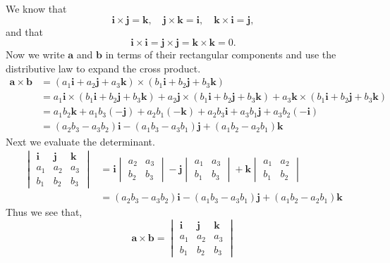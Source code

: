 {%
\begin{Solution}
\label{solution matrix form of cross product}
We know that 
\[
\mathbf{i} \times \mathbf{j} = \mathbf{k}, \quad
\mathbf{j} \times \mathbf{k} = \mathbf{i}, \quad
\mathbf{k} \times \mathbf{i} = \mathbf{j},
\]
and that
\[
\mathbf{i} \times \mathbf{i} = 
\mathbf{j} \times \mathbf{j} = 
\mathbf{k} \times \mathbf{k} = 0.
\]
Now we write $\mathbf{a}$ and $\mathbf{b}$ in terms of their rectangular
components and use the distributive law to expand the cross product.
\begin{align*}
\mathbf{a} \times \mathbf{b}
        &= (a_1 \mathbf{i} + a_2 \mathbf{j} + a_3 \mathbf{k} ) \times
          (b_1 \mathbf{i} + b_2 \mathbf{j} + b_3 \mathbf{k} ) \\
        &= a_1 \mathbf{i} \times
          (b_1 \mathbf{i} + b_2 \mathbf{j} + b_3 \mathbf{k} ) 
        + a_2 \mathbf{j} \times
          (b_1 \mathbf{i} + b_2 \mathbf{j} + b_3 \mathbf{k} ) 
        + a_3 \mathbf{k} \times
          (b_1 \mathbf{i} + b_2 \mathbf{j} + b_3 \mathbf{k} ) \\
        &= a_1 b_2 \mathbf{k} + a_1 b_3 (- \mathbf{j})
        + a_2 b_1 (- \mathbf{k}) + a_2 b_3 \mathbf{i}
        + a_3 b_1 \mathbf{j} + a_3 b_2 (- \mathbf{i}) \\
        &= (a_2 b_3 - a_3 b_2) \mathbf{i} - (a_1 b_3 - a_3 b_1) \mathbf{j}
        + (a_1 b_2 - a_2 b_1) \mathbf{k}
\end{align*}
Next we evaluate the determinant.
\begin{align*}
\begin{vmatrix}
\mathbf{i} & \mathbf{j} & \mathbf{k} \\
a_1 & a_2 & a_3 \\
b_1 & b_2 & b_3
\end{vmatrix}
        &=      \mathbf{i}
                \begin{vmatrix}
                a_2 & a_3 \\
                b_2 & b_3 
                \end{vmatrix}
                - \mathbf{j}
                \begin{vmatrix}
                a_1 & a_3 \\
                b_1 & b_3 
                \end{vmatrix}
                + \mathbf{k}
                \begin{vmatrix}
                a_1 & a_2 \\
                b_1 & b_2 
                \end{vmatrix} \\
        &= (a_2 b_3 - a_3 b_2) \mathbf{i} - (a_1 b_3 - a_3 b_1) \mathbf{j}
        + (a_1 b_2 - a_2 b_1) \mathbf{k}
\end{align*}
Thus we see that,
\[
\mathbf{a} \times \mathbf{b} =
\begin{vmatrix}
\mathbf{i} & \mathbf{j} & \mathbf{k} \\
a_1 & a_2 & a_3 \\
b_1 & b_2 & b_3
\end{vmatrix}
\]
\end{Solution}




}
